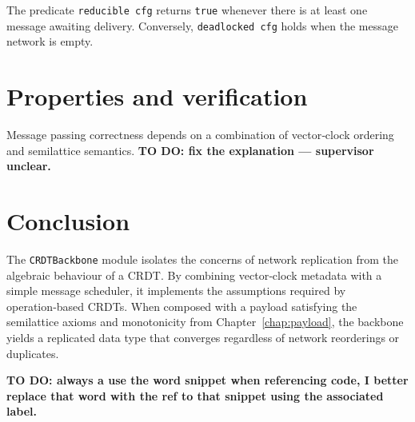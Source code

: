 The predicate \lstinline{reducible cfg} returns \lstinline{true} whenever there is at least one message awaiting delivery.  
Conversely, \lstinline{deadlocked cfg} holds when the message network is empty.

\section{Properties and verification}

Message passing correctness depends on a combination of vector‑clock ordering and semilattice semantics.  
\textbf{TO DO: fix the explanation — supervisor unclear.}

\section{Conclusion}

The \texttt{CRDTBackbone} module isolates the concerns of network replication from the algebraic behaviour of a CRDT.  
By combining vector‑clock metadata with a simple message scheduler, it implements the assumptions required by operation‑based CRDTs.  
When composed with a payload satisfying the semilattice axioms and monotonicity from Chapter~\ref{chap:payload},  
the backbone yields a replicated data type that converges regardless of network reorderings or duplicates.

\textbf{TO DO: always a use the word snippet when referencing code, I better replace that word with the ref to that snippet using the associated label.}
\endinput